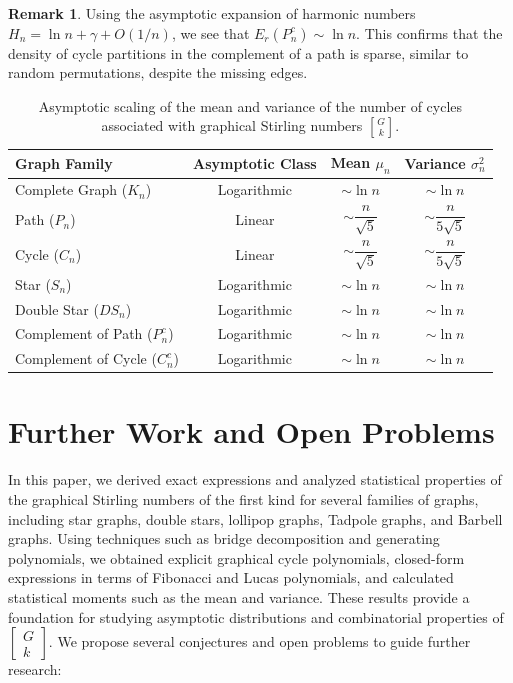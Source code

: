 \documentclass{amsart}
\theoremstyle{definition}
\newtheorem{remark}[theorem]{Remark}
\def\st#1#2{\begin{bmatrix} #1 \\ #2 \end{bmatrix}}
\begin{document}
\begin{remark}
Using the asymptotic expansion of harmonic numbers $H_n = \ln n + \gamma + O(1/n)$, we see that $E_r(P_n^c) \sim \ln n$. This confirms that the density of cycle partitions in the complement of a path is sparse, similar to random permutations, despite the missing edges.
\end{remark}

\begin{table}[h!]
\centering
\renewcommand{\arraystretch}{1.4}
\begin{tabular}{|l|c|c|c|}
\hline
\textbf{Graph Family} 
& \textbf{Asymptotic Class} 
& \textbf{Mean $\mu_n$} 
& \textbf{Variance $\sigma_n^2$} \\ \hline

Complete Graph ($K_n$) 
& Logarithmic 
& $\sim \ln n$ 
& $\sim \ln n$ \\ \hline

Path ($P_n$) 
& Linear 
& $\sim \dfrac{n}{\sqrt{5}}$ 
& $\sim \dfrac{n}{5\sqrt{5}}$ \\ \hline

Cycle ($C_n$) 
& Linear 
& $\sim \dfrac{n}{\sqrt{5}}$ 
& $\sim \dfrac{n}{5\sqrt{5}}$ \\ \hline

Star ($S_n$) 
& Logarithmic 
& $\sim \ln n$ 
& $\sim \ln n$ \\ \hline

Double Star ($DS_n$) 
& Logarithmic 
& $\sim \ln n$ 
& $\sim \ln n$ \\ \hline

Complement of Path ($P_n^{c}$) 
& Logarithmic 
& $\sim \ln n$ 
& $\sim \ln n$ \\ \hline

Complement of Cycle ($C_n^{c}$) 
& Logarithmic  
& $\sim \ln n$ 
& $\sim \ln n$ \\ \hline

\end{tabular}
\caption{Asymptotic scaling of the mean and variance of the number of cycles
associated with graphical Stirling numbers ${G \brack k}$.}
\end{table}
\section{Further Work and Open Problems}
\label{sec:future-work}

In this paper, we derived exact expressions and analyzed statistical properties of the graphical Stirling numbers of the first kind for several families of graphs, including star graphs, double stars, lollipop graphs, Tadpole graphs, and Barbell graphs. Using techniques such as bridge decomposition and generating polynomials, we obtained explicit graphical cycle polynomials, closed-form expressions in terms of Fibonacci and Lucas polynomials, and calculated statistical moments such as the mean and variance. These results provide a foundation for studying asymptotic distributions and combinatorial properties of $\st{G}{k}$.
We propose several conjectures and open problems to guide further research:
\end{document}
